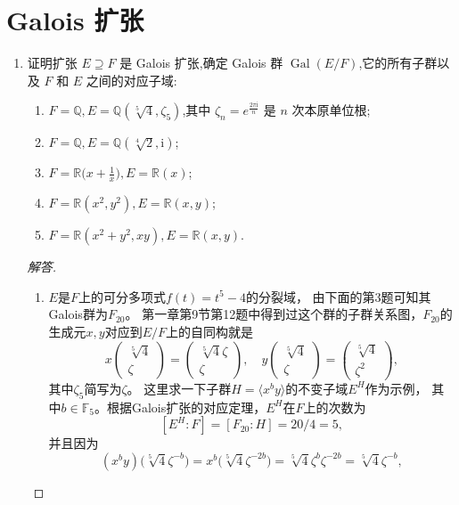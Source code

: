 \section{Galois 扩张}

\begin{enumerate}
\item 证明扩张 $ E \supseteq F $ 是 Galois 扩张,确定 Galois 群 $\operatorname{Gal}(E/F)$,它的所有子群以及 $ F $ 和 $ E $ 之间的对应子域:
\begin{enumerate}[label=(\arabic*)]
    \item $ F = \mathbb{Q}, E = \mathbb{Q}(\sqrt[5]{4}, \zeta_5) $,其中 $\zeta_n = e^{\frac{2\pi \mathrm{i}}{n}}$ 是 $ n $ 次本原单位根;
    \item $ F = \mathbb{Q}, E = \mathbb{Q}(\sqrt[4]{2}, \mathrm{i}) $;
    \item $ F = \mathbb{R}\big(x + \frac{1}{x}\big), E = \mathbb{R}(x) $;
    \item $ F = \mathbb{R}(x^2, y^2), E = \mathbb{R}(x, y) $;
    \item $ F = \mathbb{R}(x^2 + y^2, xy), E = \mathbb{R}(x, y) $.
\end{enumerate}
\begin{proof}[解答]
\begin{enumerate}[label=(\arabic*)]
    \item $E$是$F$上的可分多项式$f(t)=t^5-4$的分裂域，
    由下面的第3题可知其Galois群为$F_{20}$。
    第一章第9节第12题中得到过这个群的子群关系图，$F_{20}$的生成元$x,y$对应到$E/F$上的自同构就是
    \[x\begin{pmatrix}\sqrt[5]{4}\\\zeta\end{pmatrix}
    =\begin{pmatrix}\sqrt[5]{4}\zeta\\\zeta\end{pmatrix},
    \quad y\begin{pmatrix}\sqrt[5]{4}\\\zeta\end{pmatrix}
    =\begin{pmatrix}\sqrt[5]{4}\\\zeta^2\end{pmatrix},\]
    其中$\zeta_5$简写为$\zeta$。
    这里求一下子群$H=\langle x^by \rangle$的不变子域$E^H$作为示例，
    其中$b\in\mathbb{F}_5$。根据Galois扩张的对应定理，$E^H$在$F$上的次数为
    \[[E^H:F]=[F_{20}:H]=20/4=5,\]
    并且因为
    \[(x^by)\big(\sqrt[5]{4}\zeta^{-b}\big)=x^b\big(\sqrt[5]{4}\zeta^{-2b}\big)
    =\sqrt[5]{4}\zeta^{b}\zeta^{-2b}=\sqrt[5]{4}\zeta^{-b},\]

\end{enumerate}
\end{proof}
\end{enumerate}
